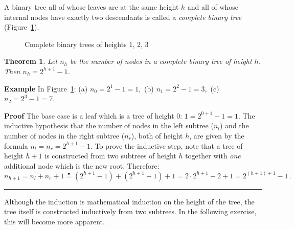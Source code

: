 \documentclass[11pt,a4paper]{report}
\newcommand*{\ih}{\stackrel{\bullet}{=}}
\newcommand*{\qed}{\hfill\rule{1ex}{1.5ex}}
\newcommand*{\qedd}[1]{\vspace*{-#1ex}\qed}
\newtheorem{theorem}{Theorem}
\begin{document}
A binary tree all of whose leaves are at the same height $h$ and all of whose internal nodes have exactly two descendants is called a \emph{complete binary tree} (Figure~\ref{fig.complete}). 

\begin{figure}[b]
\begin{center}
\caption{Complete binary trees of heights $1$, $2$, $3$}\label{fig.complete}
\end{center}
\end{figure}

\begin{theorem}
Let $n_h$ be the number of nodes in a complete binary tree of
height $h$. Then $n_h = 2^{h+1}-1$.
\end{theorem}

\textbf{Example} In Figure~\ref{fig.complete}: (a) $n_0=2^1-1=1$,$\,$ (b) $n_1 = 2^2-1=3$,$\,$ (c) $n_2 = 2^3-1=7$.

\textbf{Proof} The base case is a leaf which is a tree of height $0$: $1 = 2^{0+1}-1=1$. The inductive hypothesis that the number of nodes in the left subtree ($n_l$) and the number of nodes in the right subtree ($n_r$), both of height $h$, are given by the formula $n_l=n_r=2^{h+1}-1$. To prove the inductive step, note that a tree of height $h+1$ is constructed from two subtrees of height $h$ together with \emph{one} additional node which is the new root. Therefore:
\[
n_{h+1} = n_l + n_r + 1 \ih{} (2^{h+1}-1) + (2^{h+1}-1) + 1 = 2\cdot 2^{h+1} -2 +1= 2^{(h+1)+1} - 1\,.
\]

\qedd{5}

Although the induction is mathematical induction on the height of the tree, the tree itself is constructed inductively from two subtrees. In the following exercise, this will become more apparent.
\end{document}
